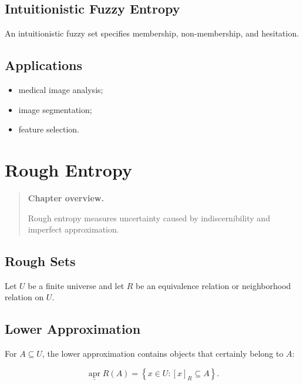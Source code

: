 \documentclass[11pt,oneside]{book}
\theoremstyle{remark}
\newcommand{\Lower}{\underline{\operatorname{apr}}}
\newenvironment{chapteroverview}
{
	\begin{quote}
		\small
		\textbf{Chapter overview.}
	}
	{
	\end{quote}
}
\newenvironment{applicationlist}
{
	\begin{itemize}[label=\(\blacktriangleright\)]
	}
	{
	\end{itemize}
}
\begin{document}
	\section{Intuitionistic Fuzzy Entropy}
	
	An intuitionistic fuzzy set specifies membership, non-membership, and
	hesitation.
	
	\section*{Applications}
	
	\begin{applicationlist}
		\item medical image analysis;
		\item image segmentation;
		\item feature selection.
	\end{applicationlist}
	
	
	\chapter{Rough Entropy}
	\label{chap:rough-entropy}
	
	\begin{chapteroverview}
		Rough entropy measures uncertainty caused by indiscernibility and imperfect
		approximation.
	\end{chapteroverview}
	
	\section{Rough Sets}
	
	Let \(U\) be a finite universe and let \(R\) be an equivalence relation or
	neighborhood relation on \(U\).
	
	\section{Lower Approximation}
	
	For \(A\subseteq U\), the lower approximation contains objects that certainly
	belong to \(A\):
	
	\[
	\Lower{R}(A)
	=
	\left\{
	x\in U:
	[x]_R\subseteq A
	\right\}.
	\]
	
\end{document}
